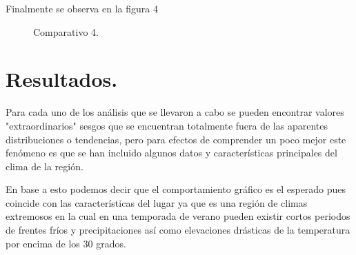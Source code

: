 \documentclass{article} %
\begin{document}
Finalmente se observa en la figura 4 

\begin{center}%

\begin{figure}%
    \centering
    \qquad
    \caption{Comparativo 4.}%
\end{figure}
	
\end{center}%

\section{Resultados.}

Para cada uno de los análisis que se llevaron a cabo se pueden encontrar valores "extraordinarios" sesgos que se encuentran totalmente fuera de las aparentes distribuciones o tendencias, pero para efectos de comprender un poco mejor este fenómeno es que se han incluido algunos datos y características principales del clima de la región.

\vspace{0.5 cm}

En base a esto podemos decir que el comportamiento gráfico es el esperado pues coincide con las características del lugar ya que es una región de climas extremosos en la cual en una temporada de verano pueden existir cortos periodos de frentes fríos y precipitaciones así como elevaciones drásticas de la temperatura por encima de los 30 grados. 
\end{document}
